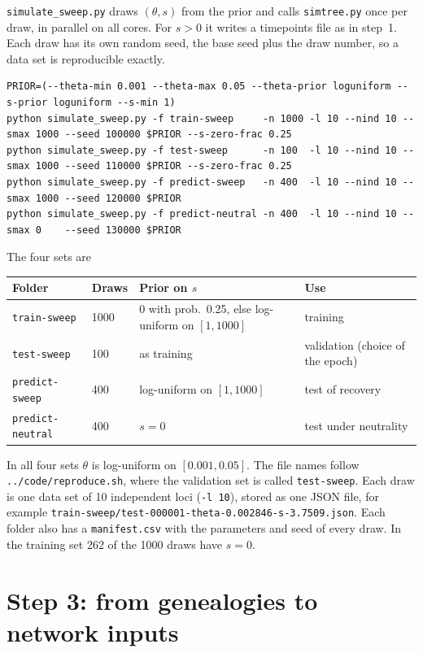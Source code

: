 \documentclass[11pt]{article}
\newcommand{\file}[1]{\texttt{#1}}
\begin{document}
\file{simulate\_sweep.py} draws $(\theta,s)$ from the prior and calls
\file{simtree.py} once per draw, in parallel on all cores.
For $s{>}0$ it writes a timepoints file as in step~1.
Each draw has its own random seed, the base seed plus the draw number,
so a data set is reproducible exactly.
\begin{lstlisting}
PRIOR=(--theta-min 0.001 --theta-max 0.05 --theta-prior loguniform --s-prior loguniform --s-min 1)
python simulate_sweep.py -f train-sweep     -n 1000 -l 10 --nind 10 --smax 1000 --seed 100000 $PRIOR --s-zero-frac 0.25
python simulate_sweep.py -f test-sweep      -n 100  -l 10 --nind 10 --smax 1000 --seed 110000 $PRIOR --s-zero-frac 0.25
python simulate_sweep.py -f predict-sweep   -n 400  -l 10 --nind 10 --smax 1000 --seed 120000 $PRIOR
python simulate_sweep.py -f predict-neutral -n 400  -l 10 --nind 10 --smax 0    --seed 130000 $PRIOR
\end{lstlisting}
The four sets are
\begin{center}
\small
\begin{tabular}{@{}llp{}l@{}}
\toprule
Folder & Draws & Prior on $s$ & Use \\
\midrule
\file{train-sweep}     & 1000 & 0 with prob.\ 0.25, else log-uniform on $[1,1000]$ & training \\
\file{test-sweep}      & 100  & as training & validation (choice of the epoch) \\
\file{predict-sweep}   & 400  & log-uniform on $[1,1000]$ & test of recovery \\
\file{predict-neutral} & 400  & $s{=}0$ & test under neutrality \\
\bottomrule
\end{tabular}
\end{center}
In all four sets $\theta$ is log-uniform on $[0.001,0.05]$.
The file names follow \file{../code/reproduce.sh}, where the validation set
is called \file{test-sweep}.
Each draw is one data set of 10 independent loci (\texttt{-l 10}),
stored as one JSON file, for example
\file{train-sweep/test-000001-theta-0.002846-s-3.7509.json}.
Each folder also has a \file{manifest.csv} with the parameters and seed
of every draw.
In the training set 262 of the 1000 draws have $s{=}0$.

\section{Step 3: from genealogies to network inputs}\label{sec:step3}
\end{document}
